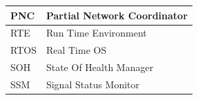 \begin{longtable}{|l|l|}
\begin{minipage}{0.31\linewidth}\raggedright\vspace{.75ex}PNC\vspace{.75ex}\end{minipage} & \begin{minipage}{0.63\linewidth}\raggedright\vspace{.75ex}Partial Network Coordinator\vspace{.75ex}\end{minipage}\\\hline
\begin{minipage}{0.31\linewidth}\raggedright\vspace{.75ex}RTE\vspace{.75ex}\end{minipage} & \begin{minipage}{0.63\linewidth}\raggedright\vspace{.75ex}Run Time Environment\vspace{.75ex}\end{minipage}\\\hline
\begin{minipage}{0.31\linewidth}\raggedright\vspace{.75ex}RTOS\vspace{.75ex}\end{minipage} & \begin{minipage}{0.63\linewidth}\raggedright\vspace{.75ex} Real Time OS\vspace{.75ex}\end{minipage}\\\hline
\begin{minipage}{0.31\linewidth}\raggedright\vspace{.75ex}SOH\vspace{.75ex}\end{minipage} & \begin{minipage}{0.63\linewidth}\raggedright\vspace{.75ex}State Of Health Manager\vspace{.75ex}\end{minipage}\\\hline
\begin{minipage}{0.31\linewidth}\raggedright\vspace{.75ex}SSM\vspace{.75ex}\end{minipage} & \begin{minipage}{0.63\linewidth}\raggedright\vspace{.75ex}Signal Status Monitor\vspace{.75ex}\end{minipage}\\\hline

\end{longtable}
